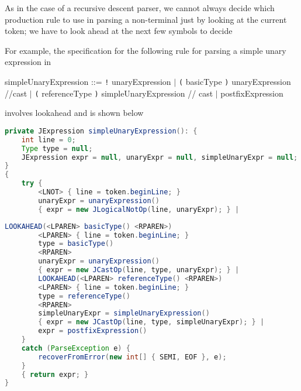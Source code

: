 \documentclass[8pt,a4paper,compress]{beamer}
\newcommand{\mm}[1]{$#1$}
\newenvironment{spaced}
{
\smallskip
\hspace{.5cm}
\begin{minipage}[c]{\textwidth}
}
{
\end{minipage}
\smallskip
}
\begin{document}
\begin{frame}[fragile]
\pause

As in the case of a recursive descent parser, we cannot always decide which production rule to use in parsing a non-terminal just by looking at the current token; we have to look ahead at the next few symbols to decide

\pause
\bigskip

For example, the specification for the following rule for parsing a simple unary expression in \jmm

\text{ }
\begin{spaced}
\begin{production}
simpleUnaryExpression ::= \lstinline{!} unaryExpression
                                   \mm{|} \lstinline{(} basicType \lstinline{)}  unaryExpression //cast
                                   \mm{|} \lstinline{(} referenceType \lstinline{)} simpleUnaryExpression // cast
                                   \mm{|} postfixExpression
\end{production}
\end{spaced}
\noindent involves lookahead and is shown below

\begin{lstlisting}[language=Java]
private JExpression simpleUnaryExpression(): {
    int line = 0;
    Type type = null;
    JExpression expr = null, unaryExpr = null, simpleUnaryExpr = null;
}
{
    try {
        <LNOT> { line = token.beginLine; }
        unaryExpr = unaryExpression()
        { expr = new JLogicalNotOp(line, unaryExpr); } |
\end{lstlisting}
\end{frame}

\begin{frame}[fragile]
\pause

\begin{lstlisting}[language=Java]
        LOOKAHEAD(<LPAREN> basicType() <RPAREN>)
        <LPAREN> { line = token.beginLine; }
        type = basicType()
        <RPAREN>
        unaryExpr = unaryExpression()
        { expr = new JCastOp(line, type, unaryExpr); } |
        LOOKAHEAD(<LPAREN> referenceType() <RPAREN>)
        <LPAREN> { line = token.beginLine; }
        type = referenceType()
        <RPAREN>
        simpleUnaryExpr = simpleUnaryExpression()
        { expr = new JCastOp(line, type, simpleUnaryExpr); } |
        expr = postfixExpression()
    }
    catch (ParseException e) {
        recoverFromError(new int[] { SEMI, EOF }, e);
    }
    { return expr; }
}
\end{lstlisting}
\end{frame}
\end{document}
